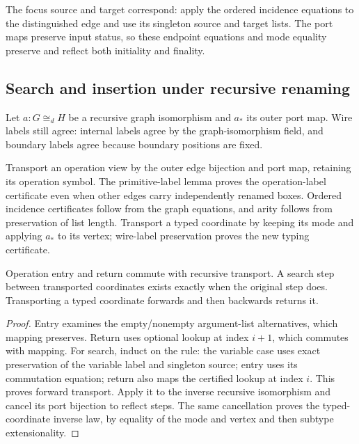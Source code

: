 The focus source and target correspond: apply the ordered incidence equations
to the distinguished edge and use its singleton source and target lists.
The port maps preserve input status, so these endpoint equations and mode
equality preserve and reflect both initiality and finality.

\subsection{Search and insertion under recursive renaming}
Let $a:G\cong_d H$ be a recursive graph isomorphism and $a_*$ its outer port
map. Wire labels still agree: internal labels agree by the graph-isomorphism
field, and boundary labels agree because boundary positions are fixed.

Transport an operation view by the outer edge bijection and port map, retaining
its operation symbol. The primitive-label lemma proves the operation-label
certificate even when other edges carry independently renamed boxes. Ordered
incidence certificates follow from the graph equations, and arity follows
from preservation of list length. Transport a typed coordinate by keeping
its mode and applying $a_*$ to its vertex; wire-label preservation proves
the new typing certificate.

\begin{lemma}
Operation entry and return commute with recursive transport. A search step
between transported coordinates exists exactly when the original step does.
Transporting a typed coordinate forwards and then backwards returns it.
\end{lemma}
\begin{proof}
Entry examines the empty/nonempty argument-list alternatives, which mapping
preserves. Return uses optional lookup at index $i+1$, which commutes with
mapping. For search, induct on the rule: the variable case uses exact
preservation of the variable label and singleton source; entry uses its
commutation equation; return also maps the certified lookup at index $i$.
This proves forward transport. Apply it to the inverse recursive isomorphism
and cancel its port bijection to reflect steps. The same cancellation proves
the typed-coordinate inverse law, by equality of the mode and vertex and
then subtype extensionality.
\end{proof}

